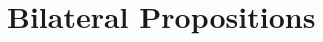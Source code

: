 \documentclass[a4paper, 11pt]{article} %
\theoremstyle{Pthm}
\begin{document}
\begin{enumerate}[leftmargin=.25in]
\end{enumerate}




\section*{Bilateral Propositions}%
\end{document}
